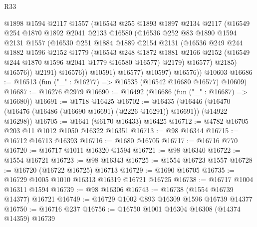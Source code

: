 \begin{lexlean}{R33}
\begin{coremodule}
                  @1898
                  @1594
                  @2117
                  @1557
                  (@16543
                    @255
                    @1893
                    @1897
                    @2134
                    @2117
                    (@16549
                      @254
                      @1870
                      @1892
                      @2041
                      @2133
                      @16580
                      (@16536
                        @252
                        @83
                        @1890
                        @1594
                        @2131
                        @1557
                        (@16530
                          @251
                          @1884
                          @1889
                          @2154
                          @2131
                          (@16536
                            @249
                            @244
                            @1882
                            @1596
                            @2152
                            @1779
                            (@16543
                              @248
                              @1872
                              @1881
                              @2166
                              @2152
                              (@16549 @244 @1870 @1596 @2041 @1779 @16580 @16577)
                              @2179)
                            @16577)
                          @2185)
                        @16576))
                    @2191)
                  @16576))
              @10591)
            @16577)
          @10597)
        @16576))
    @10603
@16686 := @16513 (fun ("_" : @16277) => @16535 (@16542 @16680 @16577) @10609)
@16687 := @16276 @2979
@16690 := @16492 (@16686 (fun ("_" : @16687) => @16680))
@16691 := @1718 @16425
@16702 := @16435
    (@16446 (@16470 (@16476 (@16486 (@16690 @16691) (@2226 @16291)) @16691)) (@14922 @16298))
@16705 := @1641 (@6170 @16433) @16425
@16712 := @4782 @16705 @203 @11 @1012 @1050 @16322 @16351
@16713 := @98 @16344
@16715 := @16712 @16713 @16393
@16716 := @1680 @16705
@16717 := @16716 @770
@16720 := @16717 @1011 @16320 @1594
@16721 := @98 @16340
@16722 := @1554 @16721
@16723 := @98 @16343
@16725 := @1554 @16723 @1557
@16728 := @16720 (@16722 @16725) @16713
@16729 := @1690 @16705
@16735 := @16729 @1005 @1010 @16313 @16319 @16721 @16725
@16738 := @16717 @1004 @16311 @1594
@16739 := @98 @16306
@16743 := @16738 (@1554 @16739 @14377) @16721
@16749 := @16729 @1002 @893 @16309 @1596 @16739 @14377
@16750 := @16716 @237
@16756 := @16750 @1001 @16304 @16308 (@14374 @14359) @16739

\end{coremodule}
\end{lexlean}
